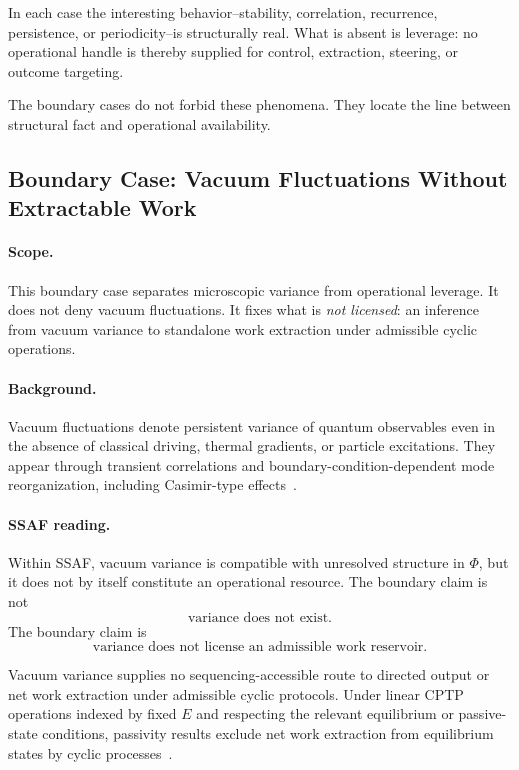 \documentclass[aps,prx,onecolumn,11pt]{revtex4-2}
\theoremstyle{plain}
\theoremstyle{definition}
\theoremstyle{remark}
\begin{document}
In each case the interesting behavior--stability, correlation,
recurrence, persistence, or periodicity--is structurally real. What is
absent is leverage: no operational handle is thereby supplied for
control, extraction, steering, or outcome targeting.

The boundary cases do not forbid these phenomena. They locate the line
between structural fact and operational availability.

\subsection{Boundary Case: Vacuum Fluctuations Without Extractable Work}
\label{subsec:vacuum_fluctuations_boundary}

\paragraph{Scope.}

This boundary case separates microscopic variance from operational
leverage. It does not deny vacuum fluctuations. It fixes what is
\emph{not licensed}: an inference from vacuum variance to standalone
work extraction under admissible cyclic operations.

\paragraph{Background.}

Vacuum fluctuations denote persistent variance of quantum observables
even in the absence of classical driving, thermal gradients, or
particle excitations. They appear through transient correlations and
boundary-condition-dependent mode reorganization, including
Casimir-type effects~\cite{Casimir1948}.

\paragraph{SSAF reading.}

Within SSAF, vacuum variance is compatible with unresolved structure in
\(\Phi\), but it does not by itself constitute an operational resource.
The boundary claim is not
\[
\text{variance does not exist}.
\]
The boundary claim is
\[
\text{variance does not license an admissible work reservoir}.
\]

Vacuum variance supplies no sequencing-accessible route to directed
output or net work extraction under admissible cyclic protocols. Under
linear CPTP operations indexed by fixed \(E\) and respecting the
relevant equilibrium or passive-state conditions, passivity results
exclude net work extraction from equilibrium states by cyclic
processes~\cite{Pusz1978,Lenard1978}.
\end{document}
